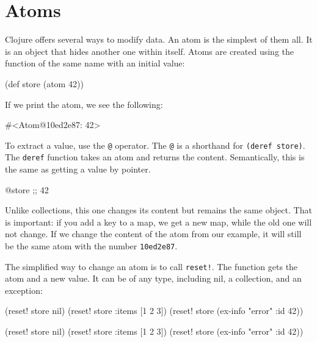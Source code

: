 \section{Atoms}


Clojure offers several ways to modify data.
An atom is the simplest of them all. It is an object that hides another one within itself.
Atoms are created using the function of the same name with an initial value:

\begin{clojure}
(def store (atom 42))
\end{clojure}

If we print the atom, we see the following:

\begin{clojure}
#<Atom@10ed2e87: 42>
\end{clojure}

To extract a value, use the \verb|@| operator.
The \verb|@| is a shorthand for \verb|(deref store)|.
The \verb|deref| function takes an atom and returns the content.
Semantically, this is the same as getting a value
by pointer.


\begin{clojure}
@store ;; 42
\end{clojure}

Unlike collections, this one changes its content but remains the same object.
That is important: if you add a key to a map, we get a new map, while the old one will not change.
If we change the content of the atom from our example, it will still be the same atom with the number \verb|10ed2e87|.


The simplified way to change an atom is to call \verb|reset!|. The function gets the atom and a new value. It can be of any type, including nil, a collection, and an exception:

\ifx\DEVICETYPE\MOBILE

\begin{clojure}
(reset! store nil)
(reset! store {:items [1 2 3]})
(reset! store (ex-info "error"
                {:id 42}))
\end{clojure}

\else

\begin{clojure}
(reset! store nil)
(reset! store {:items [1 2 3]})
(reset! store (ex-info "error" {:id 42}))
\end{clojure}
\fi


